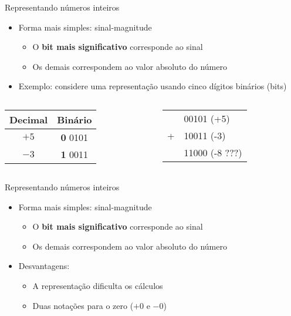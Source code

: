 \documentclass[t, aspectratio=169]{beamer}
\begin{document}
\begin{frame}[label={sec:orgca2a64c}]{Representando números inteiros}
\begin{itemize}
\item Forma mais simples: \alert{sinal-magnitude}
\begin{itemize}
\item O {\bfseries\color{highlight}bit mais significativo} corresponde ao sinal
\item Os demais correspondem ao valor absoluto do número
\end{itemize}

\item Exemplo: considere uma representação usando cinco dígitos binários (\alert{bits})
\end{itemize}

\begin{columns}
\begin{column}{0.5\columnwidth}
\begin{center}
\begin{tabular}{*{2}{c}}
\toprule
\alert{Decimal} & \alert{Binário}\\
\midrule
\(+5\) & {\bfseries\color{highlight}0} 0101\\
\(-3\) & {\bfseries\color{highlight}1} 0011\\
\bottomrule
\end{tabular}
\end{center}
\end{column}

\begin{column}{0.5\columnwidth}
\begin{center}
\begin{tabular}{ll}
 & 00101 (+5)\\
+ & 10011 (-3)\\
\hline
 & 11000 (-8 ???)\\
\end{tabular}
\end{center}
\end{column}
\end{columns}
\end{frame}

\begin{frame}[label={sec:orgfda2b7c}]{Representando números inteiros}
\begin{itemize}
\item Forma mais simples: \alert{sinal-magnitude}
\begin{itemize}
\item O {\bfseries\color{highlight}bit mais significativo} corresponde ao sinal
\item Os demais correspondem ao valor absoluto do número
\end{itemize}

\item \alert{Desvantagens}:
\begin{itemize}
\item A representação dificulta os cálculos
\item Duas notações para o zero (\(+0\) e \(-0\))
\end{itemize}
\end{itemize}
\end{frame}
\end{document}

